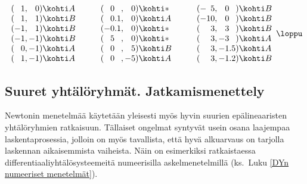 \[
\begin{array}{lll}
(\phantom{-}1,\phantom{-}0)\kohti A\qquad & 
(\phantom{-}0\phantom{.0},\phantom{-}0)\kohti * \qquad & 
(-\phantom{1}5,\phantom{-}0\phantom{.0})\kohti B \\ 
(\phantom{-}1,\phantom{-}1)\kohti B\qquad & 
(\phantom{-}0.1,\phantom{-}0)\kohti A \qquad & 
(-10,\phantom{-}0\phantom{.0})\kohti B \\
(-1,\phantom{-}1)\kohti B\qquad & 
(-0.1,\phantom{-}0)\kohti * \qquad & 
(\phantom{-1}3,\phantom{-}3\phantom{.0})\kohti B \\
(-1,-1)\kohti B\qquad & 
(\phantom{-}5\phantom{.0},\phantom{-}0)\kohti * \qquad & 
(\phantom{-1}3,-3\phantom{.0})\kohti A \\
(\phantom{-}0,-1)\kohti A\qquad & 
(\phantom{-}0\phantom{.0},\phantom{-}5)\kohti B \qquad & 
(\phantom{-1}3,-1.5)\kohti A \\
(\phantom{-}1,-1)\kohti A\qquad & 
(\phantom{-}0\phantom{.0},-5)\kohti A \qquad & 
(\phantom{-1}3,-1.2)\kohti B \\
\end{array} \loppu
\]

\subsection*{Suuret yhtälöryhmät. Jatkamismenettely}

Newtonin menetelmää käytetään yleisesti myös hyvin suurien epälineaaristen yhtälöryhmien
ratkaisuun. Tällaiset ongelmat syntyvät usein osana laajempaa laskentaprosessia, jolloin
on myös tavallista, että hyvä alkuarvaus on tarjolla laskennan aikaisemmista vaiheista.
Näin on  esimerkiksi ratkaistaessa differentiaaliyhtälösysteemeitä numeerisilla
askelmenetelmillä (ks.\ Luku \ref{DYn numeeriset menetelmät}). 

